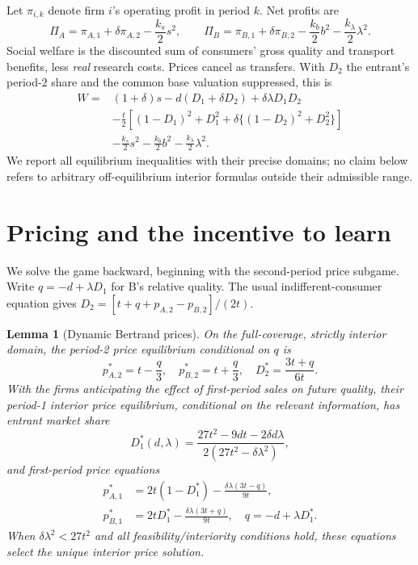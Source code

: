 \documentclass[11pt,a4paper]{article}
\numberwithin{equation}{section}
\newtheorem{lemma}{Lemma}
\theoremstyle{remark}
\newcommand{\kl}{k_{\lambda}}
\begin{document}
Let $\pi_{i,k}$ denote firm $i$'s operating profit in period $k$. Net profits are
\begin{equation}
 \Pi_A=\pi_{A,1}+\delta\pi_{A,2}-\frac{k_s}{2}s^2,\qquad
 \Pi_B=\pi_{B,1}+\delta\pi_{B,2}-\frac{k_b}{2}b^2-\frac{\kl}{2}\lambda^2.
 \label{eq:netprofits}
\end{equation}
Social welfare is the discounted sum of consumers' gross quality and transport benefits, less \emph{real} research costs. Prices cancel as transfers. With $D_2$ the entrant's period-2 share and the common base valuation suppressed, this is
\begin{align}
W={}&(1+\delta)s-d(D_1+\delta D_2)+\delta\lambda D_1D_2 \nonumber\\
&-\frac{t}{2}\left[(1-D_1)^2+D_1^2+
 \delta\{(1-D_2)^2+D_2^2\}\right] \nonumber\\
&-\frac{k_s}{2}s^2-\frac{k_b}{2}b^2-\frac{\kl}{2}\lambda^2.
\label{eq:welfare}
\end{align}
We report all equilibrium inequalities with their precise domains; no claim below refers to arbitrary off-equilibrium interior formulas outside their admissible range.

\section{Pricing and the incentive to learn}\label{sec:prices}

We solve the game backward, beginning with the second-period price subgame. Write $q=-d+\lambda D_1$ for B's relative quality. The usual indifferent-consumer equation gives $D_2=[t+q+p_{A,2}-p_{B,2}]/(2t)$.

\begin{lemma}[Dynamic Bertrand prices]\label{lem:prices}
On the full-coverage, strictly interior domain, the period-2 price equilibrium conditional on $q$ is
\begin{equation}
 p_{A,2}^*=t-\frac{q}{3},\quad
 p_{B,2}^*=t+\frac{q}{3},\quad
 D_2^*=\frac{3t+q}{6t}. \label{eq:p2}
\end{equation}
With the firms anticipating the effect of first-period sales on future quality, their period-1 interior price equilibrium, conditional on the relevant information, has entrant market share
\begin{equation}
 D_1^*(d,\lambda)=
 \frac{27t^2-9dt-2\delta d\lambda}
 {2(27t^2-\delta\lambda^2)}, \label{eq:d1}
\end{equation}
and first-period price equations
\begin{align}
p_{A,1}^*&=2t(1-D_1^*)-\frac{\delta\lambda(3t-q)}{9t},\label{eq:p1a}\\
p_{B,1}^*&=2tD_1^*-\frac{\delta\lambda(3t+q)}{9t},\quad q=-d+\lambda D_1^*.\label{eq:p1b}
\end{align}
When $\delta\lambda^2<27t^2$ and all feasibility/interiority conditions hold, these equations select the unique interior price solution.
\end{lemma}
\end{document}
